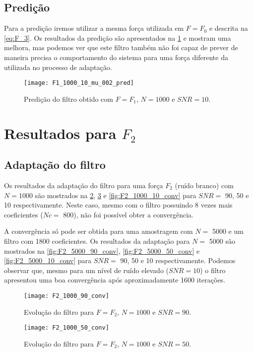 \subsection{Predição}

Para a predição iremos utilizar a mesma força utilizada em $ F=F_0 $ e descrita na \cref{eq:F_3}. Os resultados da predição são apresentados na \cref{fig:F1_1000_10_mu_002_pred} e mostram uma melhora, mas podemos ver que este filtro também não foi capaz de prever de maneira precisa o comportamento do sistema para uma força diferente da utilizada no processo de adaptação.

\begin{figure}[h]
	\centering
	\texttt{[image: F1\_1000\_10\_mu\_002\_pred]}
	\caption{Predição do filtro obtido com $ F=F_1 $, $ N=1000 $ e $ SNR=10 $.}
	\label{fig:F1_1000_10_mu_002_pred}
\end{figure}

\section{Resultados para $ F_2 $}
\subsection{Adaptação do filtro}

Os resultados da adaptação do filtro para uma força $ F_2 $ (ruído branco) com $ N=1000 $ são mostrados na \cref{fig:F2_1000_90_conv}, \cref{fig:F2_1000_50_conv} e \cref{fig:F2_1000_10_conv} para $ SNR = $ 90, 50 e 10  respectivamente. Neste caso, mesmo com o filtro possuindo 8 vezes mais coeficientes ($ Nc = $ 800), não foi possível obter a convergência.

A convergência só pode ser obtida para uma amostragem com $ N= $ 5000 e um filtro com 1800 coeficientes. Os resultados da adaptação para $ N= $ 5000 são mostrados na \cref{fig:F2_5000_90_conv}, \cref{fig:F2_5000_50_conv} e \cref{fig:F2_5000_10_conv} para $ SNR = $ 90, 50 e 10  respectivamente. Podemos observar que, mesmo para um nível de ruído elevado ($ SNR=10 $) o filtro apresentou uma boa convergência após aproximadamente 1600 iterações.

\begin{figure}[h]
	\centering
	\texttt{[image: F2\_1000\_90\_conv]}
	\caption{Evolução do filtro para $ F=F_2 $, $ N=1000 $ e $ SNR=90 $.}
	\label{fig:F2_1000_90_conv}
\end{figure}

\begin{figure}
	\centering
	\texttt{[image: F2\_1000\_50\_conv]}
	\caption{Evolução do filtro para $ F=F_2 $, $ N=1000 $ e $ SNR=50 $.}
	\label{fig:F2_1000_50_conv}
\end{figure}


